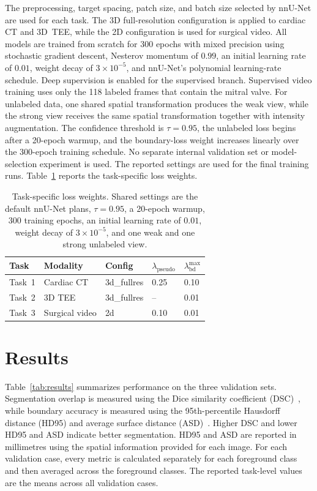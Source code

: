 \documentclass[runningheads]{llncs}
\begin{document}
The preprocessing, target spacing, patch size, and batch size selected
by nnU-Net are used for each task. The 3D full-resolution
configuration is applied to cardiac CT and 3D~TEE, while the 2D
configuration is used for surgical video. All models are trained from
scratch for 300 epochs with mixed precision using stochastic gradient
descent, Nesterov momentum of $0.99$, an initial learning rate of
$0.01$, weight decay of $3\times10^{-5}$, and nnU-Net's polynomial
learning-rate schedule. Deep supervision is enabled for the supervised
branch. Supervised video training uses only the 118 labeled frames that
contain the mitral valve. For unlabeled data, one shared spatial
transformation produces the weak view, while the strong view receives
the same spatial transformation together with intensity augmentation.
The confidence threshold is $\tau=0.95$, the unlabeled loss begins
after a 20-epoch warmup, and the boundary-loss weight increases
linearly over the 300-epoch training schedule. No separate internal
validation set or model-selection experiment is used. The reported
settings are used for the final training runs. Table~\ref{tab:cfg}
reports the task-specific loss weights.

\begin{table}[t]
\caption{Task-specific loss weights. Shared settings are the default
nnU-Net plans, $\tau=0.95$, a 20-epoch warmup, 300 training epochs,
an initial learning rate of $0.01$, weight decay of
$3\times10^{-5}$, and one weak and one strong unlabeled view.}
\label{tab:cfg}
\centering
\begin{tabular}{lllll}
\toprule
Task & Modality & Config & $\lambda_{\mathrm{pseudo}}$ &
$\lambda_{\mathrm{bd}}^{\max}$ \\
\midrule
Task~1 & Cardiac CT      & 3d\_fullres & 0.25 & 0.10 \\
Task~2 & 3D TEE          & 3d\_fullres & --   & 0.01 \\
Task~3 & Surgical video  & 2d          & 0.10 & 0.01 \\
\bottomrule
\end{tabular}
\end{table}

\section{Results}
\label{sec:results}

Table~\ref{tab:results} summarizes performance on the three validation
sets. Segmentation overlap is measured using the Dice similarity
coefficient (DSC)~\cite{ref_dice,ref_taha_metrics}, while boundary
accuracy is measured using the 95th-percentile Hausdorff distance
(HD95) and average surface distance
(ASD)~\cite{ref_hausdorff,ref_taha_metrics}. Higher DSC and lower HD95
and ASD indicate better segmentation. HD95 and ASD are reported in
millimetres using the spatial information provided for each image. For
each validation case, every metric is calculated separately for each
foreground class and then averaged across the foreground classes. The
reported task-level values are the means across all validation cases.
\end{document}
